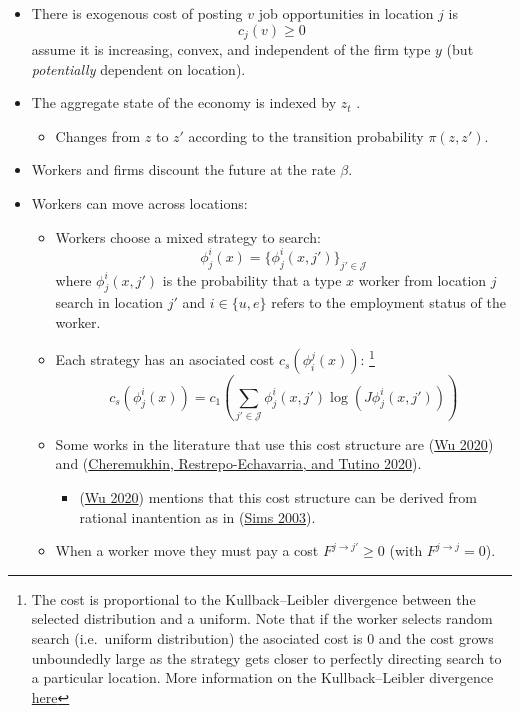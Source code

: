 \documentclass[
  letterpaper,
  DIV=11,
  numbers=noendperiod]{scrreprt}
\providecommand{\tightlist}{%
  \setlength{\itemsep}{0pt}\setlength{\parskip}{0pt}}\usepackage{longtable,booktabs,array}
\begin{document}
\begin{itemize}
\tightlist
\item
  There is exogenous cost of posting \(v\) job opportunities in location
  \(j\) is \[c_{j}(v)\geq0\] assume it is increasing, convex, and
  independent of the firm type \(y\) (but \emph{potentially} dependent
  on location).
\item
  The aggregate state of the economy is indexed by \(z_t\) .

  \begin{itemize}
  \tightlist
  \item
    Changes from \(z\) to \(z'\) according to the transition probability
    \(\pi(z, z')\).
  \end{itemize}
\item
  Workers and firms discount the future at the rate \(\beta\).
\item
  Workers can move across locations:

  \begin{itemize}
  \tightlist
  \item
    Workers choose a mixed strategy to search: \[
    \phi^i_j(x) = \{\phi^i_j(x, j')\}_{j'\in \mathcal{J}}
    \] where \(\phi^i_j(x, j')\) is the probability that a type \(x\)
    worker from location \(j\) search in location \(j'\) and
    \(i\in \{u,e\}\) refers to the employment status of the worker.
  \item
    Each strategy has an asociated cost \(c_s(\phi_i^j(x))\):
    \footnote{The cost is proportional to the Kullback--Leibler
      divergence between the selected distribution and a uniform. Note
      that if the worker selects random search (i.e.~uniform
      distribution) the asociated cost is \(0\) and the cost grows
      unboundedly large as the strategy gets closer to perfectly
      directing search to a particular location. More information on the
      Kullback--Leibler divergence
      \href{https://en.wikipedia.org/wiki/Kullback\%E2\%80\%93Leibler_divergence}{here}}
    \[c_s(\phi^i_j(x)) = c_1 \left(\sum_{j'\in \mathcal{J}}\phi^i_j(x, j')\log{(J\phi^i_j(x, j'))}\right)\]
  \item
    Some works in the literature that use this cost structure are
    (\protect\hyperlink{ref-wuPartiallyDirectedSearch2020}{Wu 2020}) and
    (\protect\hyperlink{ref-cheremukhinTargetedSearchMatching2020}{Cheremukhin,
    Restrepo-Echavarria, and Tutino 2020}).

    \begin{itemize}
    \tightlist
    \item
      (\protect\hyperlink{ref-wuPartiallyDirectedSearch2020}{Wu 2020})
      mentions that this cost structure can be derived from rational
      inantention as in
      (\protect\hyperlink{ref-simsImplicationsRationalInattention2003}{Sims
      2003}).
    \end{itemize}
  \item
    When a worker move they must pay a cost \(F^{j \to j'}\geq 0\) (with
    \(F^{j\to j} = 0\)).
  \end{itemize}
\end{itemize}
\end{document}
